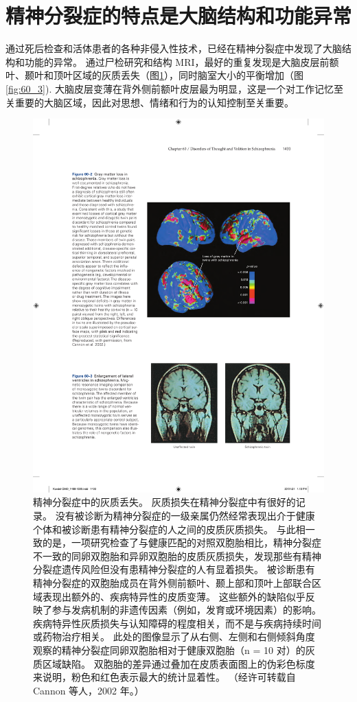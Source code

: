 \section{精神分裂症的特点是大脑结构和功能异常}
通过死后检查和活体患者的各种非侵入性技术，已经在精神分裂症中发现了大脑结构和功能的异常。 通过尸检研究和结构 MRI，最好的重复发现是大脑皮层前额叶、颞叶和顶叶区域的灰质丢失（图\ref{fig:60_2}），同时脑室大小的平衡增加（图 \ref{fig:60_3}). 大脑皮层变薄在背外侧前额叶皮层最为明显，这是一个对工作记忆至关重要的大脑区域，因此对思想、情绪和行为的认知控制至关重要。



\begin{figure}[htbp]
	\centering
	\includegraphics[width=0.7\linewidth]{chap60/fig_60_2}
	\caption{精神分裂症中的灰质丢失。 灰质损失在精神分裂症中有很好的记录。 没有被诊断为精神分裂症的一级亲属仍然经常表现出介于健康个体和被诊断患有精神分裂症的人之间的皮质灰质损失。 与此相一致的是，一项研究检查了与健康匹配的对照双胞胎相比，精神分裂症不一致的同卵双胞胎和异卵双胞胎的皮质灰质损失，发现那些有精神分裂症遗传风险但没有患精神分裂症的人有显着损失。 被诊断患有精神分裂症的双胞胎成员在背外侧前额叶、颞上部和顶叶上部联合区域表现出额外的、疾病特异性的皮质变薄。 这些额外的缺陷似乎反映了参与发病机制的非遗传因素（例如，发育或环境因素）的影响。 疾病特异性灰质损失与认知障碍的程度相关，而不是与疾病持续时间或药物治疗相关。 此处的图像显示了从右侧、左侧和右侧倾斜角度观察的精神分裂症同卵双胞胎相对于健康双胞胎（n = 10 对）的灰质区域缺陷。 双胞胎的差异通过叠加在皮质表面图上的伪彩色标度来说明，粉色和红色表示最大的统计显着性。 （经许可转载自 Cannon 等人，2002 年。）}
	\label{fig:60_2}
\end{figure}

